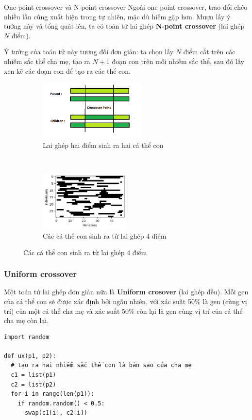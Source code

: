 \begin{frame}{One-point crossover và N-point crossover}
  Ngoài one-point crossover, trao đổi chéo nhiều lần cũng xuất hiện trong tự
  nhiên, mặc dù hiếm gặp hơn. Mượn lấy ý tưởng này và tổng quát lên, ta có toán
  tử lai ghép \textbf{N-point crossover} (lai ghép $N$ điểm).

  Ý tưởng của toán tử này tương đối đơn giản: ta chọn lấy $N$ điểm cắt trên các
  nhiễm sắc thể cha mẹ, tạo ra $N + 1$ đoạn con trên mỗi nhiễm sắc thể, sau đó
  lấy xen kẽ các đoạn con để tạo ra các thể con.
\begin{figure}[t!]
    \centering
    \begin{subfigure}[t]{0.5\textwidth}
        \centering
        \includegraphics[height=1.2in]{res/2pco.png}
        \caption{Lai ghép hai điểm sinh ra hai cá thể con}
    \end{subfigure}%
    ~ 
    \begin{subfigure}[t]{0.5\textwidth}
        \centering
        \includegraphics[height=1.2in]{res/4ptco.png}
        \caption{Các cá thể con sinh ra từ lai ghép 4 điểm}
    \end{subfigure}
\end{figure}
\end{frame}

\begin{frame}[fragile]
\frametitle{Uniform crossover}
  Một toán tử lai ghép đơn giản nữa là \textbf{Uniform crosover} (lai ghép đều).
  Mỗi gen của cá thể con sẽ được xác định bởi ngẫu nhiên, với xác suất 50\% là
  gen (cùng vị trí) của một cá thể cha mẹ và xác suất 50\% còn lại là gen cùng
  vị trí của cá thể cha mẹ còn lại.

  \begin{verbatim}
import random

def ux(p1, p2):
  # tạo ra hai nhiễm sắc thể con là bản sao của cha mẹ
  c1 = list(p1)
  c2 = list(p2)
  for i in range(len(p1)):
    if random.random() < 0.5:
      swap(c1[i], c2[i])
  \end{verbatim}
\end{frame}

